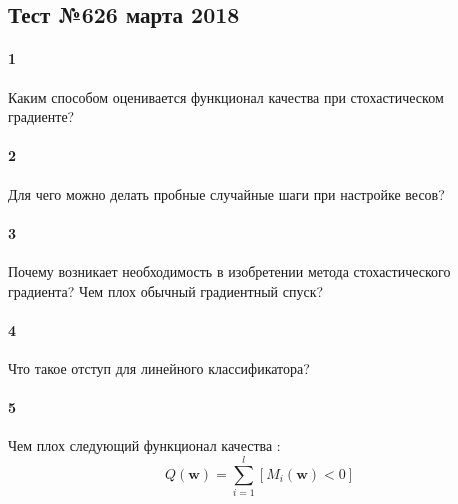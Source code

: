 \documentclass[a4paper,12pt]{article}
\begin{document}
  \subsection*{Тест №6\hfill{26 марта 2018}}

  \paragraph{1} Каким способом оценивается функционал качества при стохастическом градиенте?
  
  \makebox[\linewidth]{\hrulefill}
  \makebox[\linewidth]{\hrulefill}
  
  \paragraph{2} Для чего можно делать пробные случайные шаги при настройке весов?
  
  \makebox[\linewidth]{\hrulefill}
  \makebox[\linewidth]{\hrulefill}

  \paragraph{3} Почему возникает необходимость в изобретении метода стохастического градиента? Чем плох обычный градиентный спуск?

  \makebox[\linewidth]{\hrulefill}
  \makebox[\linewidth]{\hrulefill}
  \makebox[\linewidth]{\hrulefill}

  \paragraph{4} Что такое отступ для линейного классификатора?
    
  \makebox[\linewidth]{\hrulefill}
  \makebox[\linewidth]{\hrulefill}
  \makebox[\linewidth]{\hrulefill}
  
  \paragraph{5} Чем плох следующий функционал качества :
  $$Q(\mathbf{w}) = \sum\limits_{i=1}^l \left[ M_i(\mathbf{w}) < 0 \right] $$

  \makebox[\linewidth]{\hrulefill}
  \makebox[\linewidth]{\hrulefill}
  \makebox[\linewidth]{\hrulefill}
  \makebox[\linewidth]{\hrulefill}
  
\end{document}
